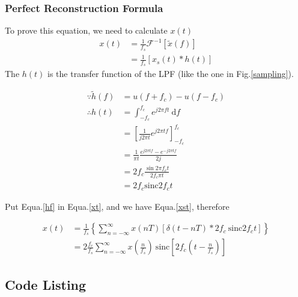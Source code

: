\documentclass{article}
\begin{document}
    

\subsubsection*{Perfect Reconstruction Formula}

To prove this equation, we need to calculate $x(t)$
\begin{align}
    x(t) &= \frac{1}{f_s} \mathcal{F}^{-1} \left[ \widetilde{x}(f) \right] \nonumber \\
    &= \frac{1}{f_s} \left[ x_s(t) * h(t) \right] \label{xt}
\end{align}
The $h(t)$ is the transfer function of the LPF (like the one in Fig.\ref{sampling}).

\begin{align}
    \because \widetilde{h}(f) &= u(f + f_c) - u(f - f_c)\nonumber \\
    \therefore h(t) &= \int_{-f_c}^{f_c} e^{j2 \pi ft} ~ \mathrm{d}f \nonumber\\
    &= \left[ \frac{1}{j2 \pi t} e^{j2 \pi t f} \right]_{-f_c }^{f_c}\nonumber \\
    &= \frac{1}{\pi t} \frac{e^{j2 \pi t f} - e^{- j2 \pi t f}}{2j}\nonumber \\
    &= 2f_c \frac{\sin 2\pi f_c t}{2f_c \pi t} \nonumber \\
    &= 2f_c \mathrm{sinc} 2f_c t \label{hf}
\end{align}

Put Equa.\ref{hf} in Equa.\ref{xt}, and we have Equa.\ref{xst}, therefore

\begin{align}
    x(t) &= \frac{1}{f_s} \left\{ \sum_{n = -\infty}^{\infty} x(nT) \left[ \delta(t - nT) * 2f_c ~ \mathrm{sinc} 2f_c t \right] \right\}\nonumber \\
    &= 2 \frac{f_c}{f_s} \sum_{n = -\infty}^{\infty}  x(\frac{n}{f_s}) ~ \mathrm{sinc}\left[ 2f_c(t - \frac{n}{f_s}) \right]
\end{align}



% 
% 

\begin{appendices}
    \section{Code Listing}

\end{appendices}
\end{document}
